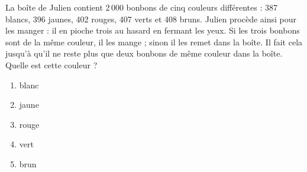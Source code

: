 La boîte de Julien contient 2\,000 bonbons de cinq couleurs différentes : 387 blancs, 396 jaunes, 402 rouges, 407 verts et 408 bruns. Julien procède ainsi pour les manger : il en pioche trois au hasard en fermant les yeux. Si les trois bonbons sont de la même couleur, il les mange ; sinon il les remet dans la boîte. Il fait cela jusqu'à qu'il ne reste plus que deux bonbons de même couleur dans la boîte. Quelle est cette couleur ?
\begin{multicols}{5}
  \begin{enumerate}[A/]
  \item blanc
  \item jaune
  \item rouge
  \item vert
  \item brun
  \end{enumerate}
\end{multicols}